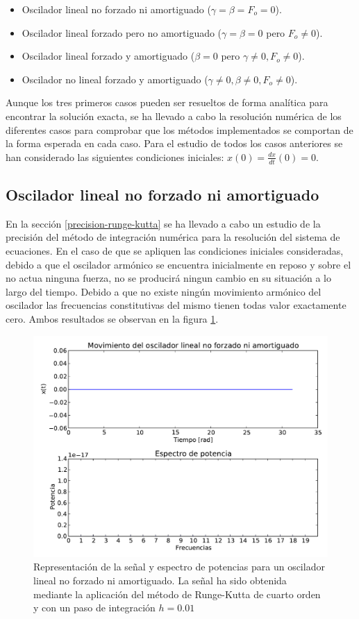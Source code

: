 \documentclass[11pt]{article}
\begin{document}
\begin{itemize}
	\item Oscilador lineal no forzado ni amortiguado ($\gamma = \beta = F_o = 0$).
	\item Oscilador lineal forzado pero no amortiguado ($\gamma = \beta = 0$ pero $F_o \neq 0$).
	\item Oscilador lineal forzado y amortiguado ($\beta = 0$ pero $\gamma \neq 0, F_o \neq0$).
	\item Oscilador no lineal forzado y amortiguado ($\gamma \neq 0, \beta \neq 0, F_o \neq 0$).
\end{itemize}

Aunque los tres primeros casos pueden ser resueltos de forma analítica para encontrar la solución exacta, se ha llevado a cabo la resolución numérica de los diferentes casos para comprobar que los métodos implementados se comportan de la forma esperada en cada caso. Para el estudio de todos los casos anteriores se han considerado las siguientes condiciones iniciales:  $x(0) = \frac{dx}{dt}(0) = 0$.

\subsection{Oscilador lineal no forzado ni amortiguado}
En la sección \ref{precision-runge-kutta} se ha llevado a cabo un estudio de la precisión del método de integración numérica para la resolución del sistema de ecuaciones. En el caso de que se apliquen las condiciones iniciales consideradas, debido a que el oscilador armónico se encuentra inicialmente en reposo y sobre el no actua ninguna fuerza, no se producirá ningun cambio en su situación a lo largo del tiempo. Debido a que no existe ningún movimiento armónico del oscilador las frecuencias constitutivas del mismo tienen todas valor exactamente cero. Ambos resultados se observan en la figura \ref{fig:caso_lineal}.

\begin{figure}
\label{fig:caso_lineal}
\centering
\includegraphics[width=0.75\linewidth]{caso_lineal.pdf}
\caption{Representación de la señal y espectro de potencias para un oscilador lineal no forzado ni amortiguado. La señal ha sido obtenida mediante la aplicación del método de Runge-Kutta de cuarto orden y con un paso de integración $h = 0.01$}
\end{figure}
\end{document}
